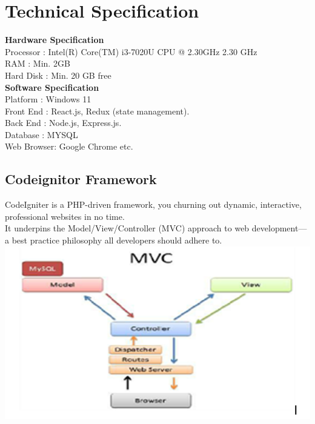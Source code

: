 \section{Technical Specification}
\textbullet \hspace{0.2cm} \textbf{Hardware Specification}\\
Processor	:	Intel(R) Core(TM) i3-7020U CPU @ 2.30GHz 2.30 GHz\\
RAM          	: 	Min. 2GB\\
Hard Disk	: 	Min. 20 GB free\\
\textbullet \hspace{0.2cm} \textbf{Software Specification}\\
Platform	:  	Windows 11\\
Front End	: 	React.js, Redux (state management). \\
Back End	: 	Node.js, Express.js. \\	
Database    : MYSQL\\
Web Browser: 	Google Chrome etc. \\


\subsection{Codeignitor Framework}
CodeIgniter is a PHP-driven framework, you churning out dynamic, interactive, professional websites in no time.\\

\textbullet \hspace{0.2cm}	It underpins the Model/View/Controller (MVC) approach to web development—a best practice philosophy all developers should adhere to.\\

\includegraphics[scale=1.0]{Ch2/mvc.png}


\label{fig:MVC Model}



